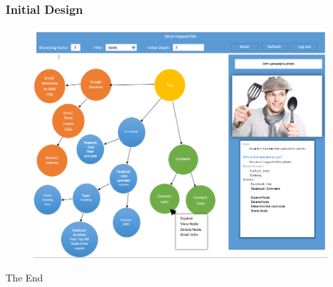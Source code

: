 \documentclass{beamer}
\begin{document}
		\begin{frame}
		\frametitle{Initial Design}
			\begin{figure}
				\includegraphics[scale=0.3]{initdesign.png}
			\end{figure}
		\end{frame}
		\begin{frame}
			\Huge{\centerline{The End}}
		\end{frame}
\end{document}
